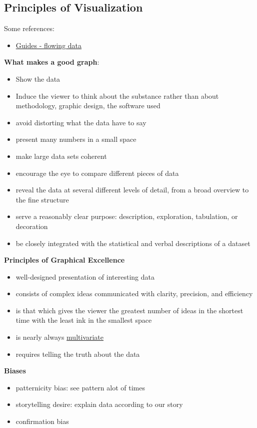 \documentclass{article}
\begin{document}
\begin{multicols}{2}
\section{Principles of Visualization}
Some references:
\begin{itemize}
	\item \href{https://flowingdata.com}{Guides - flowing data}
\end{itemize}
\textbf{What makes a good graph}:
\begin{itemize}
	\item Show the data
	\item Induce the viewer to think about the substance rather than about methodology, graphic design, the software used
	\item avoid distorting what the data have to say
	\item present many numbers in a small space
	\item make large data sets coherent
	\item encourage the eye to compare different pieces of data
	\item reveal the data at several different levels of detail, from a broad overview to the fine structure
	\item serve a reasonably clear purpose: description, exploration, tabulation, or decoration
	\item be closely integrated with the statistical and verbal descriptions of a dataset
\end{itemize}
\textbf{Principles of Graphical Excellence}
\begin{itemize}
	\item well-designed presentation of interesting data
	\item consists of complex ideas communicated with clarity, precision, and efficiency
	\item is that which gives the viewer the greatest number of ideas in the shortest time with the least ink in the smallest space
	\item is nearly always \underline{multivariate}
	\item requires telling the truth about the data
\end{itemize}
\textbf{Biases}
\begin{itemize}
	\item patternicity bias: see pattern alot of times
	\item storytelling desire: explain data according to our story
	\item confirmation bias
\end{itemize}

\end{multicols}
\end{document}
